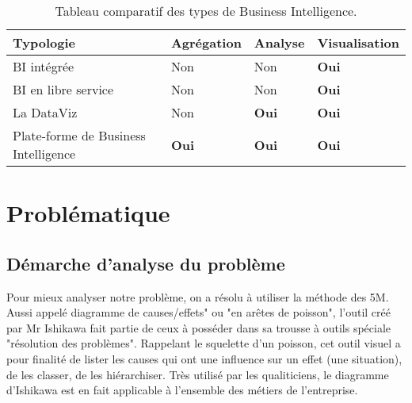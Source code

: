 \begin{table}[H]
    \centering
    \caption{Tableau comparatif des types de Business Intelligence.}
    \begin{tabular}[t]{|p{6cm}|p{3cm}|p{3cm}|p{3cm}|} 
        \hline
        \textbf{Typologie} & \textbf{Agrégation} & \textbf{Analyse} & \textbf{Visualisation} \\
        \hline\hline
        BI intégrée & Non & Non & \textbf{Oui} \\
        \hline
        BI en libre service & Non & Non & \textbf{Oui} \\
        \hline
        La DataViz & Non & \textbf{Oui} & \textbf{Oui} \\
        \hline
        Plate-forme de Business Intelligence & \textbf{Oui} & \textbf{Oui} & \textbf{Oui} \\
        \hline\hline
    \end{tabular}
    \label{tab:comparatiftypebi}
\end{table}%



\section{Problématique}
\subsection{Démarche d’analyse du problème}
Pour mieux analyser notre problème, on a résolu à utiliser la méthode des 5M. Aussi appelé diagramme de causes/effets" ou "en arêtes de poisson", l'outil créé par Mr Ishikawa fait partie de ceux à posséder dans sa trousse à outils spéciale "résolution des problèmes". Rappelant le squelette d'un poisson, cet outil visuel a pour finalité de lister les causes qui ont une influence sur un effet (une situation), de les classer, de les hiérarchiser. Très utilisé par les qualiticiens, le diagramme d'Ishikawa est en fait applicable à l'ensemble des métiers de l'entreprise.
